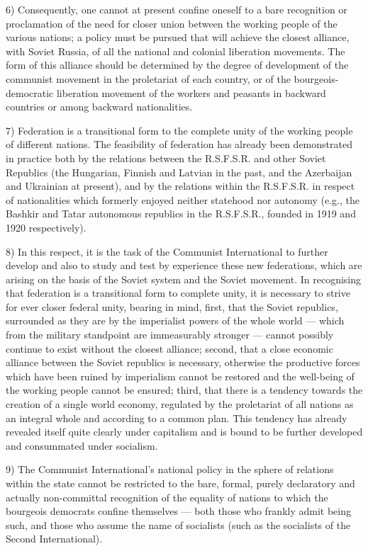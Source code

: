 6) Consequently, one cannot at present confine oneself to a bare recognition or proclamation of the need for closer union between the working people of the various nations; a policy must be pursued that will achieve the closest alliance, with Soviet Russia, of all the national and colonial liberation movements. The form of this alliance should be determined by the degree of development of the communist movement in the proletariat of each country, or of the bourgeois-democratic liberation movement of the workers and peasants in backward countries or among backward nationalities. 

7) Federation is a transitional form to the complete unity of the working people of different nations. The feasibility of federation has already been demonstrated in practice both by the relations between the R.S.F.S.R. and other Soviet Republics (the Hungarian, Finnish and Latvian in the past, and the Azerbaijan and Ukrainian at present), and by the relations within the R.S.F.S.R. in respect of nationalities which formerly enjoyed neither statehood nor autonomy (e.g., the Bashkir and Tatar autonomous republics in the R.S.F.S.R., founded in 1919 and 1920 respectively). 

8) In this respect, it is the task of the Communist International to further develop and also to study and test by experience these new federations, which are arising on the basis of the Soviet system and the Soviet movement. In recognising that federation is a transitional form to complete unity, it is necessary to strive for ever closer federal unity, bearing in mind, first, that the Soviet republics, surrounded 
as they are by the imperialist powers of the whole world — which from the military standpoint are immeasurably stronger — cannot possibly continue to exist without the closest alliance; second, that a close economic alliance between the Soviet republics is necessary, otherwise the productive forces which have been ruined by imperialism cannot be restored and the well-being of the working people cannot be ensured; third, that there is a tendency towards the creation of a single world economy, regulated by the proletariat of all nations as an integral whole and according to a common plan. This tendency has already revealed itself quite clearly under capitalism and is bound to be further developed and consummated under socialism. 

9) The Communist International's national policy in the sphere of relations within the state cannot be restricted to the bare, formal, purely declaratory and actually non-committal recognition of the equality of nations to which the bourgeois democrats confine themselves — both those 
who frankly admit being such, and those who assume the name of socialists (such as the socialists of the Second International). 


